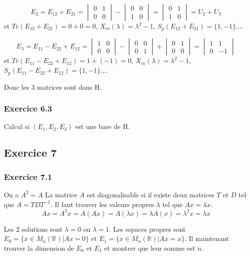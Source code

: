 \documentclass[]{book}
\theoremstyle{definition}
\newcommand{\bb}[1]{\mathbb{#1}}
\newcommand{\R}{\bb{R}}
\begin{document}
$$
E_2 = E_{12}+E_{21} = \begin{vmatrix} 0 & 1 \\ 0 & 0 \end{vmatrix} - \begin{vmatrix} 0 & 0 \\ 1 & 0 \end{vmatrix} =  \begin{vmatrix} 0 & 1 \\ 1 & 0 \end{vmatrix} = U_2 + U_3
$$
et $Tr(E_{12}+E_{21}) = 0 + 0 = 0$, $X_m(\lambda) = \lambda^2-1$, $S_p(E_{12}+E_{21}) = \{1, -1\}$.... 

$$
E_3 = E_{11}-E_{22}+E_{12} = \begin{vmatrix} 1 & 0 \\ 0 & 0 \end{vmatrix} - \begin{vmatrix} 0 & 0 \\ 0 & 1 \end{vmatrix} + \begin{vmatrix} 0 & 1 \\ 0 & 0 \end{vmatrix} =  \begin{vmatrix} 1 & 1 \\ 0 & -1 \end{vmatrix} 
$$
et $Tr(E_{11}-E_{22}+E_{12}) = 1 + (-1) = 0$, $X_m(\lambda) = \lambda^2-1$, $S_p(E_{11}-E_{22}+E_{12}) = \{1, -1\}$.... 

Donc les 3 matrices sont dans H.

\subsubsection*{Exercice 6.3}
Calcul si $(E_1, E_2, E_3)$ est une base de H. 

\subsection*{Exercice 7}
\subsubsection*{Exercice 7.1}
On a $A^2 = A$ La matrice $A$ est diagonalisable si il existe deux matrices $T$ et $D$ tel que $A=TDT^{-1}$. Il faut trouver les valeurs propres $\lambda$ tel que $Ax = \lambda x$.
$$
Ax = A^2x = A(Ax) = A(\lambda x) = \lambda A(x) = \lambda^2 x = \lambda x
$$

Les 2 solutions sont $\lambda = 0$ ou $\lambda = 1$. Les espaces propres sont $E_0 = \{x \in M_n(\R)|Ax = 0\}$ et $E_1 = \{x \in M_n(\R)|Ax = x\}$. Il maintenant trouver la dimension de $E_0$ et $E_1$ et montrer que leur somme est $n$.
\end{document}
